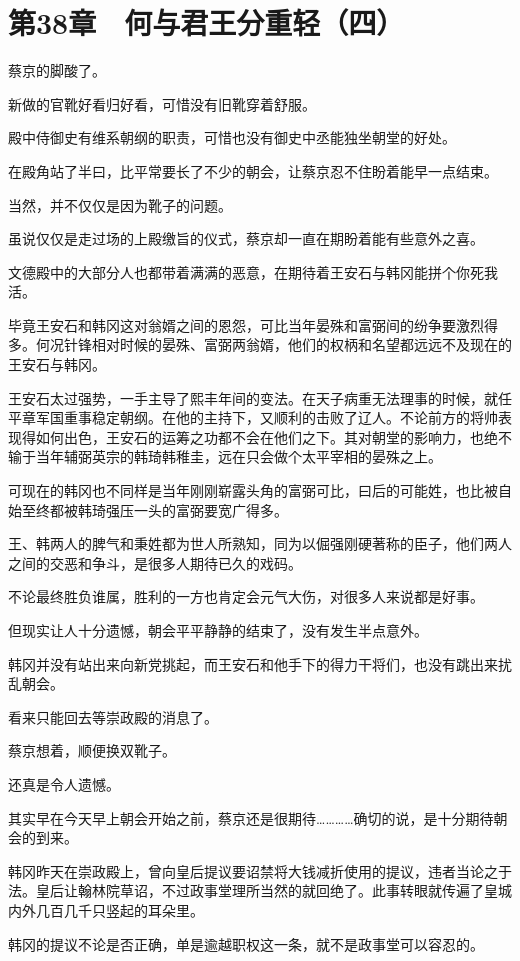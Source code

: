 \section{第38章　何与君王分重轻（四）}

蔡京的脚酸了。

新做的官靴好看归好看，可惜没有旧靴穿着舒服。

殿中侍御史有维系朝纲的职责，可惜也没有御史中丞能独坐朝堂的好处。

在殿角站了半曰，比平常要长了不少的朝会，让蔡京忍不住盼着能早一点结束。

当然，并不仅仅是因为靴子的问题。

虽说仅仅是走过场的上殿缴旨的仪式，蔡京却一直在期盼着能有些意外之喜。

文德殿中的大部分人也都带着满满的恶意，在期待着王安石与韩冈能拼个你死我活。

毕竟王安石和韩冈这对翁婿之间的恩怨，可比当年晏殊和富弼间的纷争要激烈得多。何况针锋相对时候的晏殊、富弼两翁婿，他们的权柄和名望都远远不及现在的王安石与韩冈。

王安石太过强势，一手主导了熙丰年间的变法。在天子病重无法理事的时候，就任平章军国重事稳定朝纲。在他的主持下，又顺利的击败了辽人。不论前方的将帅表现得如何出色，王安石的运筹之功都不会在他们之下。其对朝堂的影响力，也绝不输于当年辅弼英宗的韩琦韩稚圭，远在只会做个太平宰相的晏殊之上。

可现在的韩冈也不同样是当年刚刚崭露头角的富弼可比，曰后的可能姓，也比被自始至终都被韩琦强压一头的富弼要宽广得多。

王、韩两人的脾气和秉姓都为世人所熟知，同为以倔强刚硬著称的臣子，他们两人之间的交恶和争斗，是很多人期待已久的戏码。

不论最终胜负谁属，胜利的一方也肯定会元气大伤，对很多人来说都是好事。

但现实让人十分遗憾，朝会平平静静的结束了，没有发生半点意外。

韩冈并没有站出来向新党挑起，而王安石和他手下的得力干将们，也没有跳出来扰乱朝会。

看来只能回去等崇政殿的消息了。

蔡京想着，顺便换双靴子。

还真是令人遗憾。

其实早在今天早上朝会开始之前，蔡京还是很期待…………确切的说，是十分期待朝会的到来。

韩冈昨天在崇政殿上，曾向皇后提议要诏禁将大钱减折使用的提议，违者当论之于法。皇后让翰林院草诏，不过政事堂理所当然的就回绝了。此事转眼就传遍了皇城内外几百几千只竖起的耳朵里。

韩冈的提议不论是否正确，单是逾越职权这一条，就不是政事堂可以容忍的。

